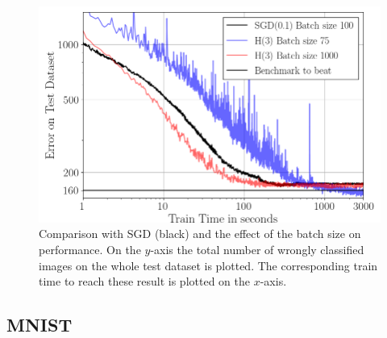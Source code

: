 \documentclass[conference]{IEEEtran}
\begin{document}
    \begin{figure}[htbp]
    	\centerline{\includegraphics[scale=0.52]{Plot_Batch_size.png}}
    	\caption{Comparison with SGD (black) and the effect of the batch size on performance. On the $y$-axis the total number of wrongly classified images on the whole test dataset is plotted. The corresponding train time to reach these result is plotted on the $x$-axis.}
    	\label{fig3}
    \end{figure}

	\subsection{MNIST}
\end{document}
